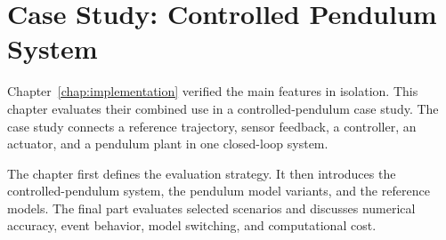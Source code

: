 \chapter{Case Study: Controlled Pendulum System}
\label{chap:case_study}

Chapter~\ref{chap:implementation} verified the main \syssimx{} features in isolation.
This chapter evaluates their combined use in a controlled-pendulum case study.
The case study connects a reference trajectory, sensor feedback, a controller, an actuator, and a pendulum plant in one closed-loop system.

The chapter first defines the evaluation strategy.
It then introduces the controlled-pendulum system, the pendulum model variants, and the reference models.
The final part evaluates selected scenarios and discusses numerical accuracy, event behavior, model switching, and computational cost.






